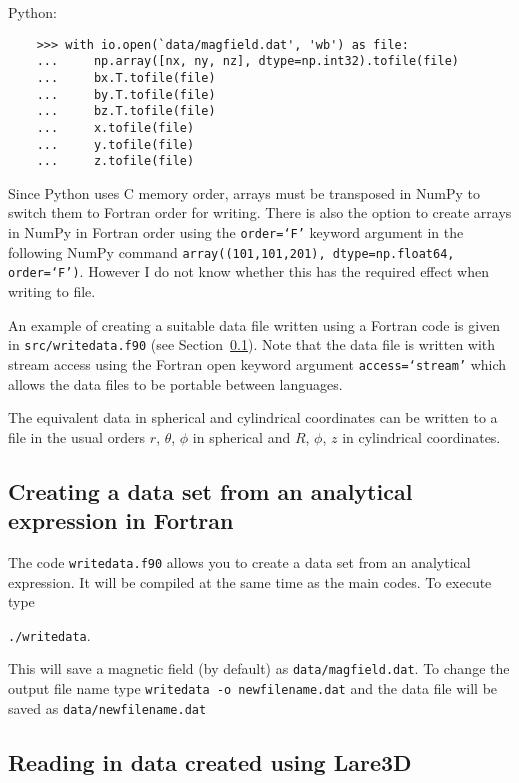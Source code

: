 \documentclass[12pt]{article}
\begin{document}
    Python:

    \begin{verbatim}
    >>> with io.open(`data/magfield.dat', 'wb') as file:
    ...     np.array([nx, ny, nz], dtype=np.int32).tofile(file)
    ...     bx.T.tofile(file)
    ...     by.T.tofile(file)
    ...     bz.T.tofile(file)
    ...     x.tofile(file)
    ...     y.tofile(file)
    ...     z.tofile(file)
    \end{verbatim}

    Since Python uses C memory order, arrays must be transposed in NumPy to switch them to Fortran order for writing. There is also the option to create arrays in NumPy in Fortran order using the \texttt{order=`F'} keyword argument in the following NumPy command \texttt{array((101,101,201), dtype=np.float64, order=`F')}. However I do not know whether this has the required effect when writing to file.

    An example of creating a suitable data file written using a Fortran code is given in \texttt{src/writedata.f90} (see Section~\ref{sec:writedata}). Note that the data file is written with stream access using the Fortran open keyword argument \texttt{access=`stream'} which allows the data files to be portable between languages.

    The equivalent data in spherical and cylindrical coordinates can be written to a file in the usual orders \( r \), \( \theta \), \( \phi \) in spherical and \( R \), \( \phi \), \( z \) in cylindrical coordinates.

    \subsection{Creating a data set from an analytical expression in Fortran}
      \label{sec:writedata}

      The code \texttt{writedata.f90} allows you to create a data set from an analytical expression. It will be compiled at the same time as the main codes. To execute type

      \texttt{./writedata}.

      This will save a magnetic field (by default) as \texttt{data/magfield.dat}. To change the output file name type \texttt{writedata -o newfilename.dat} and the data file will be saved as \texttt{data/newfilename.dat}

    \subsection{Reading in data created using Lare3D}
\end{document}
